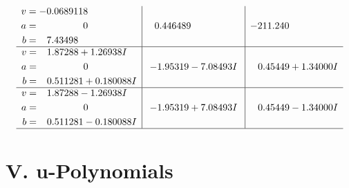 \documentclass[1p]{elsarticle_modified}
\theoremstyle{definition}
\begin{document}
$$\begin{array}{c|c|c}
\begin{aligned}
v &= -0.0689118\phantom{ +0.000000I} \\
a &= \phantom{-0.000000 } 0 \\
b &= \phantom{-}7.43498\phantom{ +0.000000I}\end{aligned}
 & \phantom{-}0.446489\phantom{ +0.000000I} & -211.240\phantom{ +0.000000I} \\ \hline\begin{aligned}
v &= \phantom{-}1.87288 + 1.26938 I \\
a &= \phantom{-0.000000 } 0 \\
b &= \phantom{-}0.511281 + 0.180088 I\end{aligned}
 & -1.95319 - 7.08493 I & \phantom{-}0.45449 + 1.34000 I \\ \hline\begin{aligned}
v &= \phantom{-}1.87288 - 1.26938 I \\
a &= \phantom{-0.000000 } 0 \\
b &= \phantom{-}0.511281 - 0.180088 I\end{aligned}
 & -1.95319 + 7.08493 I & \phantom{-}0.45449 - 1.34000 I\\
 \hline 
 \end{array}$$\newpage
\newpage\renewcommand{\arraystretch}{1}
\centering \section*{ V. u-Polynomials}
\end{document}
